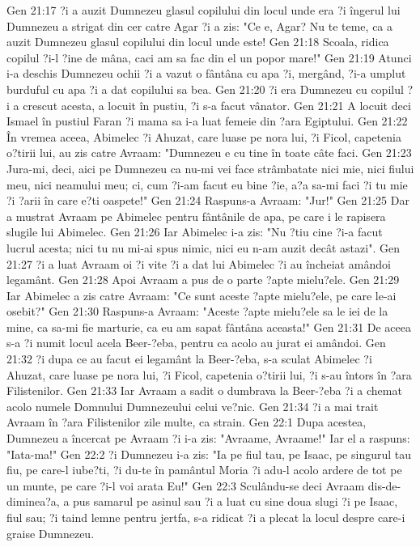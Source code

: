 Gen 21:17  ?i a auzit Dumnezeu glasul copilului din locul unde era ?i îngerul lui Dumnezeu a strigat din cer catre Agar ?i a zis: "Ce e, Agar? Nu te teme, ca a auzit Dumnezeu glasul copilului din locul unde este!
Gen 21:18  Scoala, ridica copilul ?i-l ?ine de mâna, caci am sa fac din el un popor mare!"
Gen 21:19  Atunci i-a deschis Dumnezeu ochii ?i a vazut o fântâna cu apa ?i, mergând, ?i-a umplut burduful cu apa ?i a dat copilului sa bea.
Gen 21:20  ?i era Dumnezeu cu copilul ?i a crescut acesta, a locuit în pustiu, ?i s-a facut vânator.
Gen 21:21  A locuit deci Ismael în pustiul Faran ?i mama sa i-a luat femeie din ?ara Egiptului.
Gen 21:22  În vremea aceea, Abimelec ?i Ahuzat, care luase pe nora lui, ?i Ficol, capetenia o?tirii lui, au zis catre Avraam: "Dumnezeu e cu tine în toate câte faci.
Gen 21:23  Jura-mi, deci, aici pe Dumnezeu ca nu-mi vei face strâmbatate nici mie, nici fiului meu, nici neamului meu; ci, cum ?i-am facut eu bine ?ie, a?a sa-mi faci ?i tu mie ?i ?arii în care e?ti oaspete!"
Gen 21:24  Raspuns-a Avraam: "Jur!"
Gen 21:25  Dar a mustrat Avraam pe Abimelec pentru fântânile de apa, pe care i le rapisera slugile lui Abimelec.
Gen 21:26  Iar Abimelec i-a zis: "Nu ?tiu cine ?i-a facut lucrul acesta; nici tu nu mi-ai spus nimic, nici eu n-am auzit decât astazi".
Gen 21:27  ?i a luat Avraam oi ?i vite ?i a dat lui Abimelec ?i au încheiat amândoi legamânt.
Gen 21:28  Apoi Avraam a pus de o parte ?apte mielu?ele.
Gen 21:29  Iar Abimelec a zis catre Avraam: "Ce sunt aceste ?apte mielu?ele, pe care le-ai osebit?"
Gen 21:30  Raspuns-a Avraam: "Aceste ?apte mielu?ele sa le iei de la mine, ca sa-mi fie marturie, ca eu am sapat fântâna aceasta!"
Gen 21:31  De aceea s-a ?i numit locul acela Beer-?eba, pentru ca acolo au jurat ei amândoi.
Gen 21:32  ?i dupa ce au facut ei legamânt la Beer-?eba, s-a sculat Abimelec ?i Ahuzat, care luase pe nora lui, ?i Ficol, capetenia o?tirii lui, ?i s-au întors în ?ara Filistenilor.
Gen 21:33  Iar Avraam a sadit o dumbrava la Beer-?eba ?i a chemat acolo numele Domnului Dumnezeului celui ve?nic.
Gen 21:34  ?i a mai trait Avraam în ?ara Filistenilor zile multe, ca strain.
Gen 22:1  Dupa acestea, Dumnezeu a încercat pe Avraam ?i i-a zis: "Avraame, Avraame!" Iar el a raspuns: "Iata-ma!"
Gen 22:2  ?i Dumnezeu i-a zis: "Ia pe fiul tau, pe Isaac, pe singurul tau fiu, pe care-l iube?ti, ?i du-te în pamântul Moria ?i adu-l acolo ardere de tot pe un munte, pe care ?i-l voi arata Eu!"
Gen 22:3  Sculându-se deci Avraam dis-de-diminea?a, a pus samarul pe asinul sau ?i a luat cu sine doua slugi ?i pe Isaac, fiul sau; ?i taind lemne pentru jertfa, s-a ridicat ?i a plecat la locul despre care-i graise Dumnezeu.
